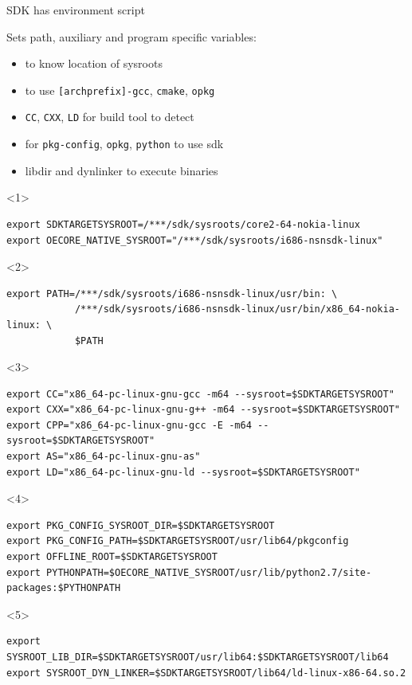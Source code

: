 \documentclass{beamer}
\begin{document}
\begin{frame}[fragile, t]{SDK has environment script}
    \begin{block}{}
        Sets path, auxiliary and program specific variables:
        \begin{itemize}
            \scriptsize
            \item<1->{to know location of sysroots}
            \item<2->{to use \verb|[archprefix]-gcc|, \verb|cmake|, \verb|opkg|}
            \item<3->{\verb|CC|, \verb|CXX|, \verb|LD| for build tool to detect}
            \item<4->{for \verb|pkg-config|, \verb|opkg|, \verb|python| to use sdk}
            \item<5->{libdir and dynlinker to execute binaries}
        \end{itemize}
    \end{block}
    \begin{onlyenv}<1>
\begin{lstlisting}[style=TinyConsole]
export SDKTARGETSYSROOT=/***/sdk/sysroots/core2-64-nokia-linux
export OECORE_NATIVE_SYSROOT="/***/sdk/sysroots/i686-nsnsdk-linux"
\end{lstlisting}
    \end{onlyenv}
    \begin{onlyenv}<2>
\begin{lstlisting}[style=TinyConsole]
export PATH=/***/sdk/sysroots/i686-nsnsdk-linux/usr/bin: \
            /***/sdk/sysroots/i686-nsnsdk-linux/usr/bin/x86_64-nokia-linux: \
            $PATH
\end{lstlisting}
    \end{onlyenv}
    \begin{onlyenv}<3>
\begin{lstlisting}[style=TinyConsole]
export CC="x86_64-pc-linux-gnu-gcc -m64 --sysroot=$SDKTARGETSYSROOT"
export CXX="x86_64-pc-linux-gnu-g++ -m64 --sysroot=$SDKTARGETSYSROOT"
export CPP="x86_64-pc-linux-gnu-gcc -E -m64 --sysroot=$SDKTARGETSYSROOT"
export AS="x86_64-pc-linux-gnu-as"
export LD="x86_64-pc-linux-gnu-ld --sysroot=$SDKTARGETSYSROOT"
\end{lstlisting}
    \end{onlyenv}
    \begin{onlyenv}<4>
\begin{lstlisting}[style=TinyConsole]
export PKG_CONFIG_SYSROOT_DIR=$SDKTARGETSYSROOT
export PKG_CONFIG_PATH=$SDKTARGETSYSROOT/usr/lib64/pkgconfig
export OFFLINE_ROOT=$SDKTARGETSYSROOT
export PYTHONPATH=$OECORE_NATIVE_SYSROOT/usr/lib/python2.7/site-packages:$PYTHONPATH
\end{lstlisting}
    \end{onlyenv}
    \begin{onlyenv}<5>
\begin{lstlisting}[style=TinyConsole]
export SYSROOT_LIB_DIR=$SDKTARGETSYSROOT/usr/lib64:$SDKTARGETSYSROOT/lib64
export SYSROOT_DYN_LINKER=$SDKTARGETSYSROOT/lib64/ld-linux-x86-64.so.2
\end{lstlisting}
    \end{onlyenv}
\end{frame}
\end{document}
